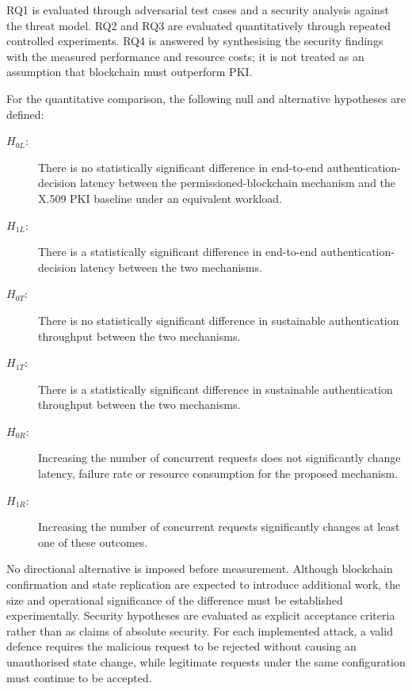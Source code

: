 RQ1 is evaluated through adversarial test cases and a security analysis against the threat model. RQ2 and RQ3 are evaluated quantitatively through repeated controlled experiments. RQ4 is answered by synthesising the security findings with the measured performance and resource costs; it is not treated as an assumption that blockchain must outperform PKI.

For the quantitative comparison, the following null and alternative hypotheses are defined:

\begin{description}
    \item[$H_{0L}$:] There is no statistically significant difference in end-to-end authentication-decision latency between the permissioned-blockchain mechanism and the X.509 PKI baseline under an equivalent workload.
    \item[$H_{1L}$:] There is a statistically significant difference in end-to-end authentication-decision latency between the two mechanisms.
    \item[$H_{0T}$:] There is no statistically significant difference in sustainable authentication throughput between the two mechanisms.
    \item[$H_{1T}$:] There is a statistically significant difference in sustainable authentication throughput between the two mechanisms.
    \item[$H_{0R}$:] Increasing the number of concurrent requests does not significantly change latency, failure rate or resource consumption for the proposed mechanism.
    \item[$H_{1R}$:] Increasing the number of concurrent requests significantly changes at least one of these outcomes.
\end{description}

No directional alternative is imposed before measurement. Although blockchain confirmation and state replication are expected to introduce additional work, the size and operational significance of the difference must be established experimentally. Security hypotheses are evaluated as explicit acceptance criteria rather than as claims of absolute security. For each implemented attack, a valid defence requires the malicious request to be rejected without causing an unauthorised state change, while legitimate requests under the same configuration must continue to be accepted.

